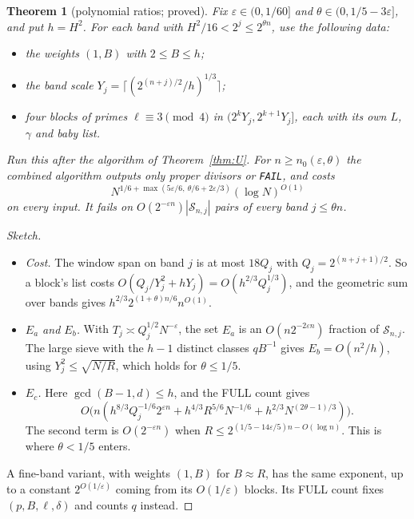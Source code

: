 \documentclass[11pt]{amsart}
\newtheorem{theorem}{Theorem}[section]
\theoremstyle{definition}
\begin{document}
\begin{theorem}[polynomial ratios; proved]\label{thm:Utheta}
Fix $\varepsilon\in(0,1/60]$ and $\theta\in(0,1/5-3\varepsilon]$, and put $h=H^2$. For each band
with $H^2/16<2^j\le2^{\theta n}$, use the following data:
\begin{itemize}
\item the weights $(1,B)$ with $2\le B\le h$;
\item the band scale $Y_j=\lceil(2^{(n+j)/2}/h)^{1/3}\rceil$;
\item four blocks of primes $\ell\equiv3\pmod4$ in $(2^kY_j,2^{k+1}Y_j]$, each with its own $L$,
  $\gamma$ and baby list.
\end{itemize}
Run this after the algorithm of Theorem~\ref{thm:U}. For $n\ge n_0(\varepsilon,\theta)$ the
combined algorithm outputs only proper divisors or \texttt{FAIL}, and costs
\[
  N^{1/6+\max(5\varepsilon/6,\ \theta/6+2\varepsilon/3)}(\log N)^{O(1)}
\]
on every input. It fails on $O(2^{-\varepsilon n})|\mathcal S_{n,j}|$ pairs of every band
$j\le\theta n$.
\end{theorem}
\begin{proof}[Sketch]
\begin{itemize}
\item \emph{Cost.} The window span on band $j$ is at most $18Q_j$ with $Q_j=2^{(n+j+1)/2}$. So a
  block's list costs $O(Q_j/Y_j^2+hY_j)=O(h^{2/3}Q_j^{1/3})$, and the geometric sum over bands gives
  $h^{2/3}2^{(1+\theta)n/6}n^{O(1)}$.
\item \emph{$E_a$ and $E_b$.} With $T_j\asymp Q_j^{1/2}N^{-\varepsilon}$, the set $E_a$ is an
  $O(n2^{-2\varepsilon n})$ fraction of $\mathcal S_{n,j}$. The large sieve with the $h-1$ distinct classes $qB^{-1}$ gives $E_b=O(n^2/h)$,
  using $Y_j^2\le\sqrt{N/R}$, which holds for $\theta\le1/5$.
\item \emph{$E_c$.} Here $\gcd(B-1,d)\le h$, and the FULL count gives
  \[
  O\bigl(n(h^{8/3}Q_j^{-1/6}2^{\varepsilon n}+h^{4/3}R^{5/6}N^{-1/6}+h^{2/3}N^{(2\theta-1)/3})\bigr).
  \]
  The second term is $O(2^{-\varepsilon n})$ when $R\le2^{(1/5-14\varepsilon/5)n-O(\log
  n)}$. This is where $\theta<1/5$ enters.
\end{itemize}
A fine-band variant, with weights $(1,B)$ for $B\approx R$, has the same exponent, up to a
constant $2^{O(1/\varepsilon)}$ coming from its $O(1/\varepsilon)$ blocks. Its FULL count fixes
$(p,B,\ell,\delta)$ and counts $q$ instead.
\end{proof}
\end{document}

